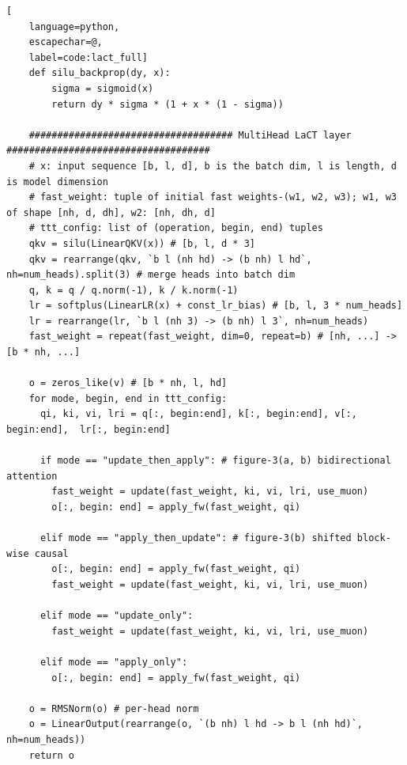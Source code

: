 \documentclass{article}
\begin{document}
\begin{algorithm}[p]
\begin{lstlisting}[
    language=python,
    escapechar=@,
    label=code:lact_full]
    def silu_backprop(dy, x):
        sigma = sigmoid(x)
        return dy * sigma * (1 + x * (1 - sigma))

    #################################### MultiHead LaCT layer ####################################
    # x: input sequence [b, l, d], b is the batch dim, l is length, d is model dimension
    # fast_weight: tuple of initial fast weights-(w1, w2, w3); w1, w3 of shape [nh, d, dh], w2: [nh, dh, d]
    # ttt_config: list of (operation, begin, end) tuples
    qkv = silu(LinearQKV(x)) # [b, l, d * 3]
    qkv = rearrange(qkv, `b l (nh hd) -> (b nh) l hd`, nh=num_heads).split(3) # merge heads into batch dim
    q, k = q / q.norm(-1), k / k.norm(-1)
    lr = softplus(LinearLR(x) + const_lr_bias) # [b, l, 3 * num_heads]
    lr = rearrange(lr, `b l (nh 3) -> (b nh) l 3`, nh=num_heads)
    fast_weight = repeat(fast_weight, dim=0, repeat=b) # [nh, ...] -> [b * nh, ...]

    o = zeros_like(v) # [b * nh, l, hd]
    for mode, begin, end in ttt_config:
      qi, ki, vi, lri = q[:, begin:end], k[:, begin:end], v[:, begin:end],  lr[:, begin:end]

      if mode == "update_then_apply": # figure-3(a, b) bidirectional attention
        fast_weight = update(fast_weight, ki, vi, lri, use_muon)
        o[:, begin: end] = apply_fw(fast_weight, qi)

      elif mode == "apply_then_update": # figure-3(b) shifted block-wise causal
        o[:, begin: end] = apply_fw(fast_weight, qi)
        fast_weight = update(fast_weight, ki, vi, lri, use_muon)

      elif mode == "update_only":
        fast_weight = update(fast_weight, ki, vi, lri, use_muon)

      elif mode == "apply_only":
        o[:, begin: end] = apply_fw(fast_weight, qi)

    o = RMSNorm(o) # per-head norm
    o = LinearOutput(rearrange(o, `(b nh) l hd -> b l (nh hd)`, nh=num_heads))
    return o
\end{lstlisting}
\end{algorithm}
\end{document}
